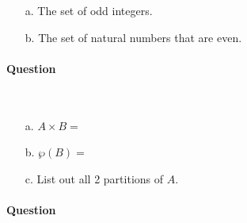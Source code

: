\documentclass[a4paper,12pt]{book} \usepackage[utf8]{inputenc} \title{} \author{Rachel Morris} \date{\today}
\newcounter{answer}
\begin{document}
        \begin{enumerate}
            \item[a.]   The set of odd integers.
            \item[b.]   The set of natural numbers that are even.
        \end{enumerate}

    \paragraph{Question \theanswer} ~\\

        \begin{enumerate}
            \item[a.]   $A \times B = $

            \item[b.]   $\wp(B) = $

            \item[c.]   List out all 2 partitions of $A$.
        \end{enumerate}

    \paragraph{Question \theanswer} ~\\
\end{document}
